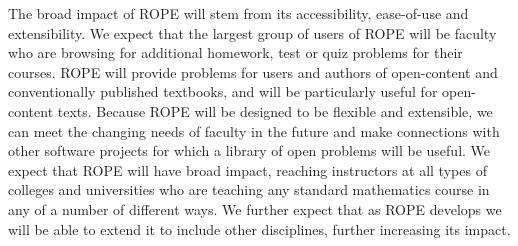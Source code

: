 \documentclass[11pt]{article}
\begin{document}
The broad impact of ROPE will stem from its accessibility, ease-of-use
and extensibility.  We expect that the largest group of users of ROPE
will be faculty who are browsing for additional homework, test or quiz
problems for their courses.  ROPE will provide problems for users and
authors of open-content and conventionally published textbooks, and will
be particularly useful for open-content texts.  Because ROPE will be
designed to be flexible and extensible, we can
meet the changing needs of faculty in the future and make connections with
other software projects for which a library of open problems will be
useful.  We expect that ROPE will have broad impact, reaching
instructors at all types of colleges and universities who are teaching any
standard mathematics course in any of a number of different ways.  We
further expect that as ROPE develops we will be able to extend it to
include other disciplines, further increasing its impact.
\end{document}
